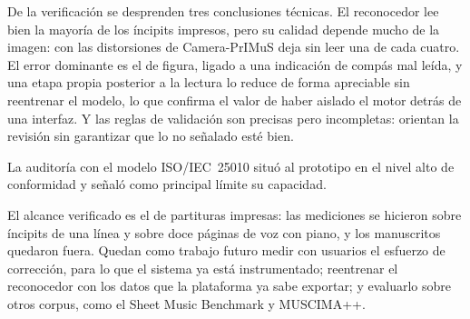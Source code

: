 \documentclass[conference]{IEEEtran}
\begin{document}
De la verificación se desprenden tres conclusiones técnicas. El
reconocedor lee bien la mayoría de los íncipits impresos, pero su calidad
depende mucho de la imagen: con las distorsiones de Camera-PrIMuS deja sin
leer una de cada cuatro. El error dominante es el de figura, ligado a una
indicación de compás mal leída, y una etapa propia posterior a la lectura
lo reduce de forma apreciable sin reentrenar el modelo, lo que confirma el
valor de haber aislado el motor detrás de una interfaz. Y las reglas de
validación son precisas pero incompletas: orientan la revisión sin
garantizar que lo no señalado esté bien.

La auditoría con el modelo ISO/IEC~25010 situó al prototipo en el nivel
alto de conformidad y señaló como principal límite su capacidad.

El alcance verificado es el de partituras impresas: las mediciones se
hicieron sobre íncipits de una línea y sobre doce páginas de voz con
piano, y los manuscritos quedaron fuera. Quedan como trabajo futuro medir
con usuarios el esfuerzo de corrección, para lo que el sistema ya está
instrumentado; reentrenar el reconocedor con los datos que la plataforma
ya sabe exportar; y evaluarlo sobre otros corpus, como el Sheet Music
Benchmark y MUSCIMA++.
\end{document}
